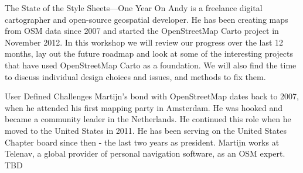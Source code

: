 %
{The State of the Style Sheets---One Year On}%
{Andy is a freelance digital cartographer and open-source geospatial developer. He has been creating maps from OSM data since 2007 and started the OpenStreetMap Carto project in November 2012. }%
{ In this workshop we will review our progress over the last 12 months, lay out the future roadmap and look at some of the interesting projects that have used OpenStreetMap Carto as a foundation. We will also find the time to discuss individual design choices and issues, and methods to fix them.
}

%
{User Defined Challenges}%
{Martijn's bond with OpenStreetMap dates back to 2007, when he attended his first mapping party in Amsterdam. He was hooked and became a community leader in the Netherlands. He continued this role when he moved to the United States in 2011. He has been serving on the United States Chapter board since then - the last two years as president. Martijn works at Telenav, a global provider of personal navigation software, as an OSM expert. }%
{TBD
}%
